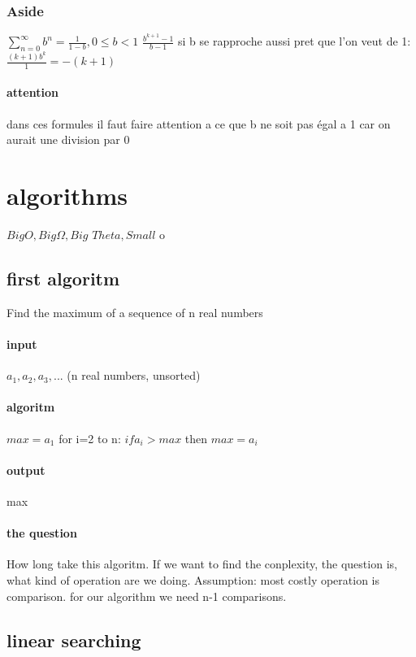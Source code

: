 \documentclass[a4paper,10pt]{article}
\begin{document}
{\subsubsection{Aside}
$\sum_{n=0}^{\infty}b^n=\frac{1}{1-b},0\leq b<1$
\newline
$\frac{b^{k+1}-1}{b-1}$ si b se rapproche aussi pret que l'on veut de 1:
\newline
$\frac{(k+1)b^k}{1}=-(k+1)$
\paragraph{attention}
dans ces formules il faut faire attention a ce que b ne soit pas égal a 1 car on aurait une division par 0

\section{algorithms}
$Big O, Big \Omega, Big$ $Theta, Small$ o
\newline
\subsection{first algoritm}
Find the maximum of a sequence of n real numbers
\paragraph{input}
$a_1,a_2,a_3,...$ (n real numbers, unsorted)
\paragraph{algoritm}
$max=a_1$
\newline
for i=2 to n:
\newline
$if a_i>max$ then $max=a_i$
\paragraph{output}
max
\paragraph{the question}
How long take this algoritm. If we want to find the conplexity, the question is, what kind of operation are we doing.
\newline
Assumption: most costly operation is comparison. for our algorithm we need n-1 comparisons.
\subsection{linear searching}
}
\end{document}
